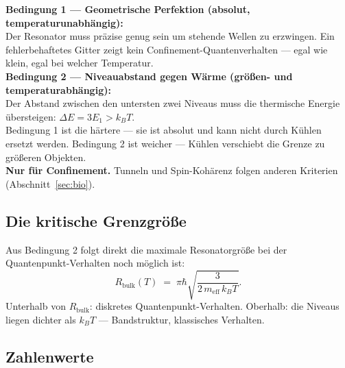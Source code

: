 \begin{important}
\textbf{Bedingung 1 --- Geometrische Perfektion (absolut, temperaturunabhängig):}\\
Der Resonator muss präzise genug sein um stehende Wellen zu erzwingen.
Ein fehlerbehaftetes Gitter zeigt kein Confinement-Quantenverhalten ---
egal wie klein, egal bei welcher Temperatur.\\[6pt]
\textbf{Bedingung 2 --- Niveauabstand gegen Wärme (größen- und temperaturabhängig):}\\
Der Abstand zwischen den untersten zwei Niveaus muss die
thermische Energie übersteigen: $\Delta E = 3E_1 > k_BT$.\\[6pt]
Bedingung 1 ist die härtere --- sie ist absolut und kann nicht
durch Kühlen ersetzt werden. Bedingung 2 ist weicher ---
Kühlen verschiebt die Grenze zu größeren Objekten.\\[4pt]
\textbf{Nur für Confinement.} Tunneln und Spin-Kohärenz
folgen anderen Kriterien (Abschnitt~\ref{sec:bio}).
\end{important}

\subsection{Die kritische Grenzgröße}

Aus Bedingung 2 folgt direkt die maximale Resonatorgröße
bei der Quantenpunkt-Verhalten noch möglich ist:
\begin{equation}
  \boxed{R_{\text{bulk}}(T) \;=\;
  \pi\hbar\sqrt{\frac{3}{2\,m_{\text{eff}}\,k_BT}}.}
\end{equation}
Unterhalb von $R_{\text{bulk}}$: diskretes Quantenpunkt-Verhalten.
Oberhalb: die Niveaus liegen dichter als $k_BT$ ---
Bandstruktur, klassisches Verhalten.

\subsection{Zahlenwerte}

\begin{center}
\end{center}

